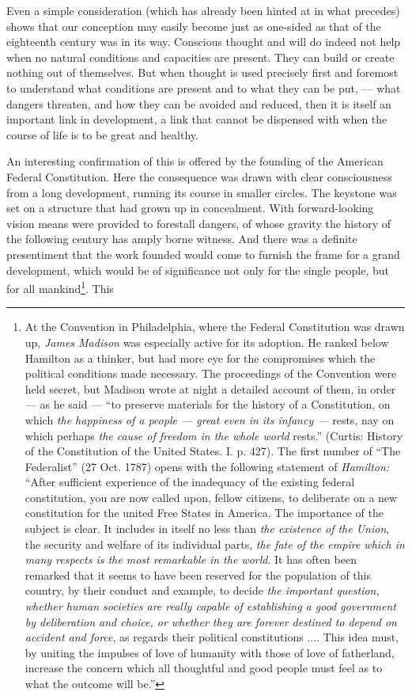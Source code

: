 \documentclass[12pt,a4paper,openany]{book}
\newcommand{\opage}[1]{\marginnote{\footnotesize\textit{[#1]}}}
\begin{document}
Even a simple consideration (which has already been hinted at
in what precedes) shows that our conception may easily become just
as one-sided as that of the eighteenth century was in its way.
Conscious thought and will do indeed not help when
no natural conditions and capacities are present. They
can build or create nothing out of themselves. But when
thought is used precisely first and foremost to understand what
conditions are present and to what they can be put,
--- what dangers threaten, and how they can be avoided
and reduced, then it is itself an important link in development,
a link that cannot be dispensed with when the course of life is to be
great and healthy.

An interesting confirmation of this is offered by
the founding of the American Federal Constitution. Here the consequence was drawn with clear
consciousness from a long development, running its course in smaller circles. The keystone was set on a structure
that had grown up in concealment. With forward-looking vision
\opage{115}means were provided to forestall dangers, of whose gravity the history of the following century has
amply borne witness. And there was a definite presentiment that the
work founded would come to furnish the frame for
a grand development, which would be of significance not only for
the single people, but for all mankind\footnote{At the Convention in Philadelphia, where the Federal Constitution was drawn up,
\emph{James Madison} was especially active for its adoption. He ranked
below Hamilton as a thinker, but had more eye for the
compromises which the political conditions made necessary.
The proceedings of the Convention were held secret, but Madison
wrote at night a detailed account of them, in order --- as he
said --- ``to preserve materials for the history of a Constitution, on
which \emph{the happiness of a people --- great even in its infancy ---} rests, nay
on which perhaps \emph{the cause of freedom in the whole world} rests.'' (Curtis:
History of the Constitution of the United States. I. p. 427). The
first number of ``The Federalist'' (27 Oct. 1787) opens with
the following statement of \emph{Hamilton:} ``After sufficient experience of the inadequacy of
the existing federal constitution, you are now called upon,
fellow citizens, to deliberate on a new constitution for the
united Free States in America. The importance of the subject is clear. It
includes in itself no less than \emph{the existence of the Union}, the security
and welfare of its individual parts, \emph{the fate of the empire which in many
respects is the most remarkable in the world}. It has often been remarked
that it seems to have been reserved for the population of this country,
by their conduct and example, to decide \emph{the important question,
whether human societies are really capable of establishing a good
government by deliberation and choice, or whether they are forever destined
to depend on accident and force}, as regards their political
constitutions .... This idea must, by uniting the impulses of love of humanity
with those of love of fatherland, increase the
concern which all thoughtful and good people must feel
as to what the outcome will be.''}. This
\end{document}
